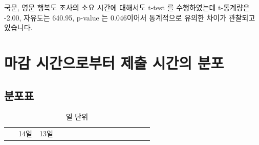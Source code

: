 \documentclass[
]{book}
\begin{document}
국문, 영문 행복도 조사의 소요 시간에 대해서도 t-test 를 수행하였는데 t-통계량은 -2.00, 자유도는 640.95, p-value 는 0.046이어서 통계적으로 유의한 차이가 관찰되고 있습니다.

\section{마감 시간으로부터 제출 시간의 분포}\label{uxb9c8uxac10-uxc2dcuxac04uxc73cuxb85cuxbd80uxd130-uxc81cuxcd9c-uxc2dcuxac04uxc758-uxbd84uxd3ec-9}

\subsection{분포표}\label{uxbd84uxd3ecuxd45c-10}

\begin{longtable}[]{@{}
  >{\raggedright\arraybackslash}p{}
  >{\centering\arraybackslash}p{}
  >{\centering\arraybackslash}p{}
  >{\centering\arraybackslash}p{}
  >{\centering\arraybackslash}p{}
  >{\centering\arraybackslash}p{}
  >{\centering\arraybackslash}p{}
  >{\centering\arraybackslash}p{}
  >{\centering\arraybackslash}p{}
  >{\centering\arraybackslash}p{}
  >{\centering\arraybackslash}p{}
  >{\centering\arraybackslash}p{}
  >{\centering\arraybackslash}p{}
  >{\centering\arraybackslash}p{}
  >{\centering\arraybackslash}p{}
  >{\centering\arraybackslash}p{}@{}}
\caption{일 단위}\tabularnewline
\toprule\noalign{}
\begin{minipage}[b]{\linewidth}\raggedright
~
\end{minipage} & \begin{minipage}[b]{\linewidth}\centering
14일
\end{minipage} & \begin{minipage}[b]{\linewidth}\centering
13일
\end{minipage} & \begin{minipage}[b]{\linewidth}\centering

\end{minipage}
\end{longtable}
\end{document}
